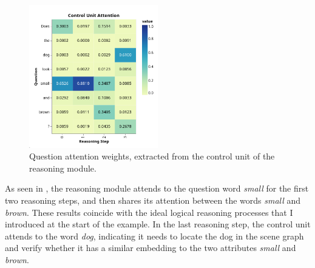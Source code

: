 \begin{figure}
    \centering
    \includegraphics[width=0.5\textwidth]{figures/positive_logical/positive_logical_control_attn.png}
    \caption{Question attention weights, extracted from the control unit of the reasoning module.}
    \label{fig:positive_logical_control_attn}
\end{figure}

As seen in \figureautorefname{ \ref{fig:positive_logical_control_attn}}, the reasoning module attends to the question word \textit{small} for the first two reasoning steps, and then shares its attention between the words \textit{small} and \textit{brown}. These results coincide with the ideal logical reasoning processes that I introduced at the start of the example. In the last reasoning step, the control unit attends to the word \textit{dog}, indicating it needs to locate the dog in the scene graph and verify whether it has a similar embedding to the two attributes \textit{small} and \textit{brown}. 

